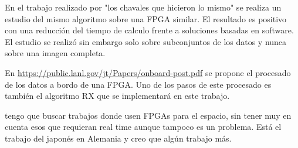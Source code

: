 En el trabajo realizado por "los chavales que hicieron lo mismo" se realiza un estudio del mismo algoritmo sobre una FPGA similar. El resultado es positivo con una reducción del tiempo de calculo frente a soluciones basadas en software. El estudio se realizó sin embargo solo sobre subconjuntos de los datos y nunca sobre una imagen completa.

En \url{https://public.lanl.gov/jt/Papers/onboard-post.pdf} se propone el procesado de los datos a bordo de una FPGA. Uno de los pasos de este procesado es también el algoritmo RX que se implementará en este trabajo.

tengo que buscar trabajos donde usen FPGAs para el espacio, sin tener muy en cuenta esos que requieran real time aunque tampoco es un problema. Está el trabajo del japonés en Alemania y creo que algún trabajo más.

